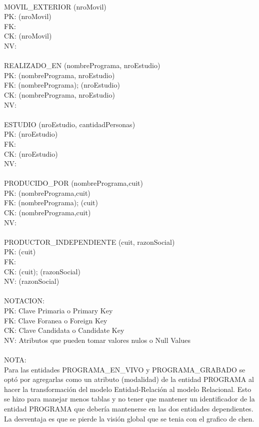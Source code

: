 \documentclass[a4paper,10pt,titlepage]{article}
\begin{document}
\\
MOVIL\_EXTERIOR (nroMovil)\\
PK: (nroMovil)\\
FK:\\
CK: (nroMovil)\\
NV:\\
\\
REALIZADO\_EN (nombrePrograma, nroEstudio)\\
PK: (nombrePrograma, nroEstudio)\\
FK: (nombrePrograma); (nroEstudio)\\
CK: (nombrePrograma, nroEstudio)\\
NV:\\
\\
ESTUDIO (nroEstudio, cantidadPersonas)\\
PK: (nroEstudio)\\
FK:\\
CK: (nroEstudio)\\
NV:\\
\\
PRODUCIDO\_POR (nombrePrograma,cuit)\\
PK: (nombrePrograma,cuit)\\
FK: (nombrePrograma); (cuit)\\
CK: (nombrePrograma,cuit)\\
NV:\\
\\
PRODUCTOR\_INDEPENDIENTE (cuit, razonSocial)\\
PK: (cuit)\\
FK:\\
CK: (cuit); (razonSocial)\\
NV: (razonSocial)\\
\\
NOTACION:\\
PK: Clave Primaria o Primary Key\\
FK: Clave Foranea o Foreign Key\\
CK: Clave Candidata o Candidate Key\\
NV: Atributos que pueden tomar valores nulos o Null Values\\
\\
NOTA:\\
Para las entidades PROGRAMA\_EN\_VIVO y PROGRAMA\_GRABADO se optó por agregarlas como un atributo (modalidad) de la entidad PROGRAMA al hacer la transformación del modelo Entidad-Relación al modelo Relacional. Esto se hizo para manejar menos tablas y no tener que mantener un identificador de la entidad PROGRAMA que debería mantenerse en las dos entidades dependientes. La desventaja es que se pierde la visión global que se tenia con el grafico de chen.\\

\pagebreak
\end{document}
